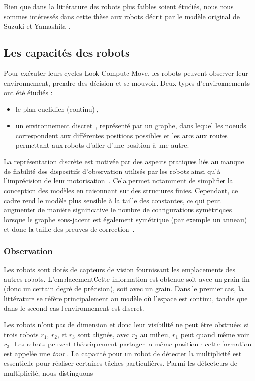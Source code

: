 Bien que dans la littérature des robots plus faibles soient étudiés,
nous nous sommes intéressés dans cette thèse aux robots décrit par le
modèle original de Suzuki et Yamashita \cite{suzuki_distributed_1999}.

\subsection{Les capacités des robots}
Pour exécuter leurs cycles Look-Compute-Move, les robots peuvent
observer leur environnement, prendre des décision et se mouvoir.  Deux
types d'environnements ont été étudiés :
\begin{itemize}
\item  le plan euclidien (continu) \cite{suzuki_distributed_1999,FPS12},
\item un environnement
  discret~\cite{KlasingMP06,flocchini_computing_2007}, représenté par
  un graphe, dans lequel les noeuds correspondent aux différentes
  positions possibles et les arcs aux routes permettant aux robots
  d'aller d'une position à une autre.
\end{itemize}
La représentation discrète est motivée par des aspects pratiques liés
au manque de fiabilité des dispositifs d'observation utilisés par les
robots ainsi qu'à l'imprécision de leur
motorisation~\cite{CDDMJ08j}. Cela permet notamment de simplifier la
conception des modèles en raisonnant sur des structures
finies. Cependant, ce cadre rend le modèle plus sensible à
la taille des constantes, ce qui peut augmenter de manière
significative le nombre de configurations symétriques lorsque le
graphe sous-jacent est également symétrique (par exemple un anneau) et
donc la taille des preuves de correction~\cite{ASN11c, KLOT11,
  KLOT12}.

\subsubsection{Observation}
 Les robots sont dotés de capteurs de vision
fournissant les emplacements des autres robots. L'emplacementCette
information est obtenue soit avec un grain fin (donc un certain degré
de précision), soit avec un grain. Dans le premier cas, la littérature
se réfère principalement au modèle où l'espace est continu, tandis que
dans le second cas l'environnement est discret.

Les robots n'ont pas de dimension et donc leur visibilité ne peut être
obstruée: si trois robots $r_1$, $r_2$, et $r_3$ sont alignés, avec
$r_2$ au milieu, $r_1$ peut quand même voir $r_3 $. Les robots peuvent
théoriquement partager la même position : cette formation est appelée
une \emph{tour} \cite{FPS12}. La capacité pour un robot de détecter la
multiplicité est essentielle pour réaliser certaines tâches
particulières. Parmi les détecteurs de multiplicité, nous distinguons :

